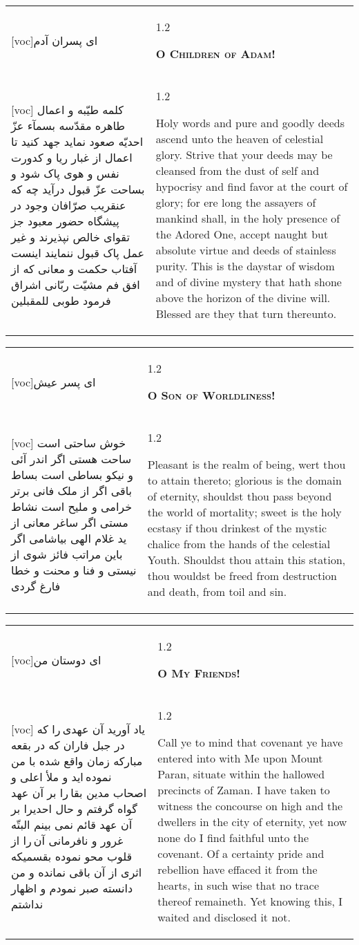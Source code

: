 \documentclass[11pt]{article}
\makeatletter
\newenvironment{orig}
  {\begin{farsi}[voc]}
  {\end{farsi}}
\newenvironment{trans}
  {\Large\begin{spacing}{1.2}\raggedright}
  {\end{spacing}}
\newenvironment{word}
  {\begin{tabular}[t]{p{2.75in}@{\hspace{3em}}p{2.75in}}}
  {\end{tabular}}
\newcommand{\ayat}[2]{\begin{orig}#1\end{orig} & \begin{trans}#2\end{trans}}
\newcommand{\heading}[2]{\textsc{\textbf{#1}} %
}
\makeatother
\begin{document}
\pagebreak

\begin{word}
\ayat{ای پسران آدم}{\heading{O Children of Adam!}{}} \\ \ayat{
کلمه طيّبه و اعمال طاهره مقدّسه بسمآء عزّ احديّه صعود نمايد
جهد کنيد تا اعمال از غبار ريا و کدورت نفس و هوی پاک شود و بساحت عزّ قبول درآيد
چه که عنقريب صرّافان وجود در پيشگاه حضور معبود جز تقوای خالص نپذيرند و غير عمل پاک قبول ننمايند
اينست آفتاب حکمت و معانی که از افق فم مشيّت ربّانی اشراق فرمود طوبی للمقبلين
}{
  Holy words and pure and goodly deeds ascend unto the heaven of celestial
  glory. Strive that your deeds may be cleansed from the dust of self and
  hypocrisy and find favor at the court of glory; for ere long the assayers of
  mankind shall, in the holy presence of the Adored One, accept naught but
  absolute virtue and deeds of stainless purity. This is the daystar of wisdom
  and of divine mystery that hath shone above the horizon of the divine will.
  Blessed are they that turn thereunto.
}
\end{word}

\pagebreak

\begin{word}
\ayat{ای پسر عيش}{\heading{O Son of Worldliness!}{}} \\ \ayat{
خوش ساحتی است ساحت هستی اگر اندر آئی و نيکو بساطی است بساط باقی اگر از ملک فانی برتر خرامی و مليح است نشاط مستی اگر ساغر معانی از يد غلام الهی بياشامی اگر باين مراتب فائز شوی از نيستی و فنا و محنت و خطا فارغ گردی
}{
  Pleasant is the realm of being, wert thou to attain thereto; glorious is the
  domain of eternity, shouldst thou pass beyond the world of mortality; sweet
  is the holy ecstasy if thou drinkest of the mystic chalice from the hands of
  the celestial Youth. Shouldst thou attain this station, thou wouldst be
  freed from destruction and death, from toil and sin.
}
\end{word}

\pagebreak

\begin{word}
\ayat{ای دوستان من}{\heading{O My Friends!}{}} \\ \ayat{
ياد آوريد آن عهدی را که در جبل فاران که در بقعه مبارکه زمان واقع شده با من نموده ايد و ملأ اعلی و اصحاب مدين بقا را بر آن عهد گواه گرفتم و حال احديرا بر آن عهد قائم نمی بينم البتّه غرور و نافرمانی آن را از قلوب محو نموده بقسميکه اثری از آن باقی نمانده و من دانسته صبر نمودم و اظهار نداشتم
}{
  Call ye to mind that covenant ye have entered into with Me upon Mount Paran,
  situate within the hallowed precincts of Zaman. I have taken to witness the
  concourse on high and the dwellers in the city of eternity, yet now none do
  I find faithful unto the covenant. Of a certainty pride and rebellion have
  effaced it from the hearts, in such wise that no trace thereof remaineth.
  Yet knowing this, I waited and disclosed it not.
}
\end{word}
\end{document}
